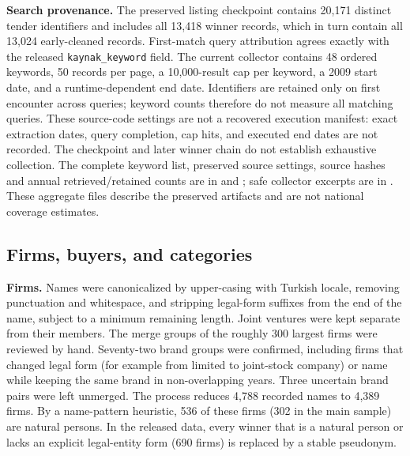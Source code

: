 \documentclass[11pt,a4paper]{article}
\begin{document}
\begin{table}[h]\centering\small
\caption{Scope classes after the value-based audit (13,024 contracts that passed the earlier count-based cleaning).}\label{tab:scope}

\end{table}

\textbf{Search provenance.} The preserved listing checkpoint contains 20,171 distinct tender identifiers and includes all 13,418 winner records, which in turn contain all 13,024 early-cleaned records. First-match query attribution agrees exactly with the released \texttt{kaynak\_keyword} field. The current collector contains 48 ordered keywords, 50 records per page, a 10,000-result cap per keyword, a 2009 start date, and a runtime-dependent end date. Identifiers are retained only on first encounter across queries; keyword counts therefore do not measure all matching queries. These source-code settings are not a recovered execution manifest: exact extraction dates, query completion, cap hits, and executed end dates are not recorded. The checkpoint and later winner chain do not establish exhaustive collection. The complete keyword list, preserved source settings, source hashes and annual retrieved/retained counts are in  and ; safe collector excerpts are in . These aggregate files describe the preserved artifacts and are not national coverage estimates.

\subsection{Firms, buyers, and categories}
\textbf{Firms.} Names were canonicalized by upper-casing with Turkish locale, removing punctuation and whitespace, and stripping legal-form suffixes from the end of the name, subject to a minimum remaining length. Joint ventures were kept separate from their members. The merge groups of the roughly 300 largest firms were reviewed by hand. Seventy-two brand groups were confirmed, including firms that changed legal form (for example from limited to joint-stock company) or name while keeping the same brand in non-overlapping years. Three uncertain brand pairs were left unmerged. The process reduces 4,788 recorded names to 4,389 firms. By a name-pattern heuristic, 536 of these firms (302 in the main sample) are natural persons. In the released data, every winner that is a natural person or lacks an explicit legal-entity form (690 firms) is replaced by a stable pseudonym.
\end{document}
